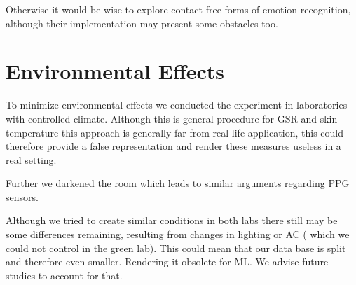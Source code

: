 Otherwise it would be wise to explore contact free forms of emotion recognition, although their implementation may present some obstacles too.

\section{Environmental Effects}
To minimize environmental effects we conducted the experiment in laboratories with controlled climate. Although this is general procedure for GSR and skin temperature this approach is generally far from real life application, this could therefore provide a false representation and render these measures useless in a real setting.

Further we darkened the room which leads to similar arguments regarding PPG sensors.

Although we tried to create similar conditions in both labs there still may be some differences remaining, resulting from changes in lighting or AC ( which we could not control in the green lab). This could mean that our data base is split and therefore even smaller. Rendering it obsolete for ML. We advise future studies to account for that.

